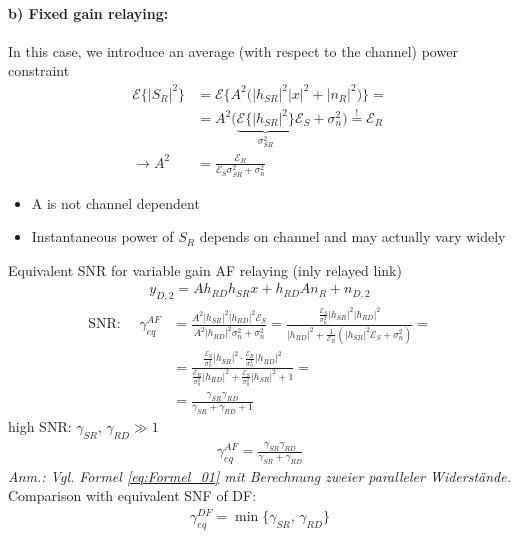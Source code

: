\documentclass[a4paper, 10pt]{article}
\begin{document}
\paragraph{b) Fixed gain relaying:} In this case, we introduce an average (with respect to the channel) power constraint
\begin{align*}
	\mathcal{E}\bigl\{|S_R|^2\bigr\} &= \mathcal{E}\bigl\{A^2\bigl(|h_{SR}|^2|x|^2 + |n_R|^2\bigr)\bigr\} = \\ &= A^2\bigl( \underbrace{\mathcal{E}\bigl\{|h_{SR}|^2\bigr\}}_{\sigma_{SR}^2}\mathcal{E}_S + \sigma_n^2\bigr) \overset{!}{=} \mathcal{E}_R \\ \rightarrow A^2 &= \frac{\mathcal{E}_R}{\mathcal{E}_S\sigma_{SR}^2 + \sigma_n^2}	 
\end{align*}
\begin{itemize}
	\item A is not channel dependent
	\item Instantaneous power of $S_R $ depends on channel and may actually vary widely
\end{itemize}
Equivalent SNR for variable gain AF relaying (inly relayed link)
\begin{align*}
	y_{D,2} = Ah_{RD}h_{SR}x + h_{RD}An_R + n_{D,2}
\end{align*}
\begin{align*}
	\text{SNR: }\quad \gamma_{eq}^{AF} &= \frac{A^2|h_{SR}|^2|h_{RD}|^2\mathcal{E}_S}{A^2|h_{RD}|^2\sigma_n^2 + \sigma_n^2} = \frac{\frac{\mathcal{E}_S}{\sigma_n^2}|h_{SR}|^2|h_{RD}|^2}{|h_{RD}|^2 + \frac{1}{\mathcal{E}_R}(|h_{SR}|^2\mathcal{E}_S + \sigma_n^2)} = \\ &= \frac{\frac{\mathcal{E}_S}{\sigma_n^2}|h_{SR}|^2\cdot\frac{\mathcal{E}_R}{\sigma_n^2}|h_{RD}|^2}{\frac{\mathcal{E}_R}{\sigma_n^2}|h_{RD}|^2 + \frac{\mathcal{E}_S}{\sigma_n^2}|h_{SR}|^2 + 1} = \\ &= \frac{\gamma_{SR}\gamma_{RD}}{\gamma_{SR} + \gamma_{RD} + 1}
\end{align*}
high SNR: $\gamma_{SR},\,\gamma_{RD} \gg 1 $
\begin{align}
	\boxed{\gamma_{eq}^{AF} = \frac{\gamma_{SR}\gamma_{RD}}{\gamma_{SR} + \gamma_{RD}}} \label{eq:Formel_01}
\end{align}
\textit{Anm.: Vgl. Formel \ref{eq:Formel_01} mit Berechnung zweier paralleler Widerst\"ande.}
Comparison with equivalent SNF of DF:
\begin{align}
	\boxed{\gamma_{eq}^{DF} = \min\bigl\{\gamma_{SR},\,\gamma_{RD}\bigr\}}\label{eq:Formel_02}
\end{align}
\end{document}
